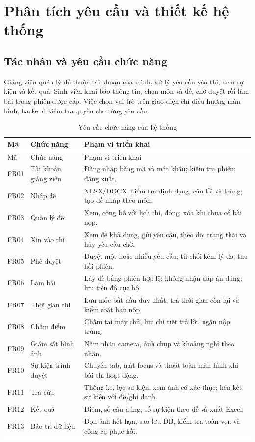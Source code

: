 \chapter{Phân tích yêu cầu và thiết kế hệ thống}
\section{Tác nhân và yêu cầu chức năng}
Giảng viên quản lý đề thuộc tài khoản của mình, xử lý yêu cầu vào thi, xem sự kiện và kết quả. Sinh viên khai báo thông tin, chọn môn và đề, chờ duyệt rồi làm bài trong phiên được cấp. Việc chọn vai trò trên giao diện chỉ điều hướng màn hình; backend kiểm tra quyền cho từng yêu cầu.

\begin{longtable}{@{}L{1.1cm}L{4.1cm}L{9.4cm}@{}}
\caption{Yêu cầu chức năng của hệ thống}\\
\toprule Mã & Chức năng & Phạm vi triển khai \\\midrule\endfirsthead
\toprule Mã & Chức năng & Phạm vi triển khai \\\midrule\endhead
FR01 & Tài khoản giảng viên & Đăng nhập bằng mã và mật khẩu; kiểm tra phiên; đăng xuất.\\
FR02 & Nhập đề & XLSX/DOCX; kiểm tra định dạng, câu lỗi và trùng; tạo đề nháp theo môn.\\
FR03 & Quản lý đề & Xem, công bố với lịch thi, đóng; xóa khi chưa có bài nộp.\\
FR04 & Xin vào thi & Xem đề khả dụng, gửi yêu cầu, theo dõi trạng thái và hủy yêu cầu chờ.\\
FR05 & Phê duyệt & Duyệt một hoặc nhiều yêu cầu; từ chối kèm lý do; thu hồi phiên.\\
FR06 & Làm bài & Lấy đề bằng phiên hợp lệ; không nhận đáp án đúng; lưu tiến độ cục bộ.\\
FR07 & Thời gian thi & Lưu mốc bắt đầu duy nhất, trả thời gian còn lại và kiểm soát hạn nộp.\\
FR08 & Chấm điểm & Chấm tại máy chủ, lưu chi tiết trả lời, ngăn nộp trùng.\\
FR09 & Giám sát hình ảnh & Năm nhãn camera, ảnh chụp và khoảng nghỉ theo nhãn.\\
FR10 & Sự kiện trình duyệt & Chuyển tab, mất focus và thoát toàn màn hình khi bài thi hoạt động.\\
FR11 & Tra cứu & Thống kê, lọc sự kiện, xem ảnh có xác thực; liên kết sự kiện với đề/ghi danh.\\
FR12 & Kết quả & Điểm, số câu đúng, số sự kiện theo đề và xuất Excel.\\
FR13 & Bảo trì dữ liệu & Dọn ảnh hết hạn, sao lưu DB, kiểm tra toàn vẹn và công cụ phục hồi.\\
\bottomrule
\end{longtable}

